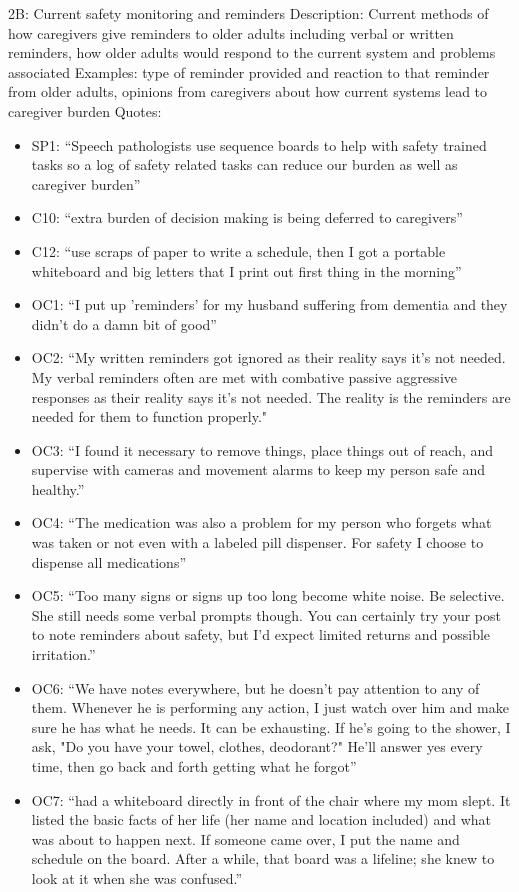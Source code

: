 \begin{itemize}
2B: Current safety monitoring and reminders
Description: Current methods of how caregivers give reminders to older adults including verbal or written reminders, how older adults would respond to the current system and problems associated 
Examples: type of reminder provided and reaction to that reminder from older adults, opinions from caregivers about how current systems lead to caregiver burden
Quotes: 
\begin{itemize}
    \item SP1: “Speech pathologists use sequence boards to help with safety trained tasks so a log of safety related tasks can reduce our burden as well as caregiver burden” 
    \item C10: “extra burden of decision making is being deferred to caregivers” 
    \item C12: “use scraps of paper to write a schedule, then I got a portable whiteboard and big letters that I print out first thing in the morning” 
    \item OC1: “I put up 'reminders' for my husband suffering from dementia and they didn't do a damn bit of good”  
    \item OC2: “My written reminders got ignored as their reality says it’s not needed. My verbal reminders often are met with combative passive aggressive responses as their reality says it’s not needed. The reality is the reminders are needed for them to function properly." 
    \item OC3: “I found it necessary to remove things, place things out of reach, and supervise with cameras and movement alarms to keep my person safe and healthy.” 
    \item OC4: “The medication was also a problem for my person who forgets what was taken or not even with a labeled pill dispenser. For safety I choose to dispense all medications”  
    \item OC5: “Too many signs or signs up too long become white noise. Be selective. She still needs some verbal prompts though. You can certainly try your post to note reminders about safety, but I'd expect limited returns and possible irritation.”  
    \item OC6: “We have notes everywhere, but he doesn't pay attention to any of them. Whenever he is performing any action, I just watch over him and make sure he has what he needs. It can be exhausting. If he's going to the shower, I ask, "Do you have your towel, clothes, deodorant?" He'll answer yes every time, then go back and forth getting what he forgot” 
    \item OC7: “had a whiteboard directly in front of the chair where my mom slept. It listed the basic facts of her life (her name and location included) and what was about to happen next. If someone came over, I put the name and schedule on the board. After a while, that board was a lifeline; she knew to look at it when she was confused.” 

\end{itemize}
\end{itemize}
